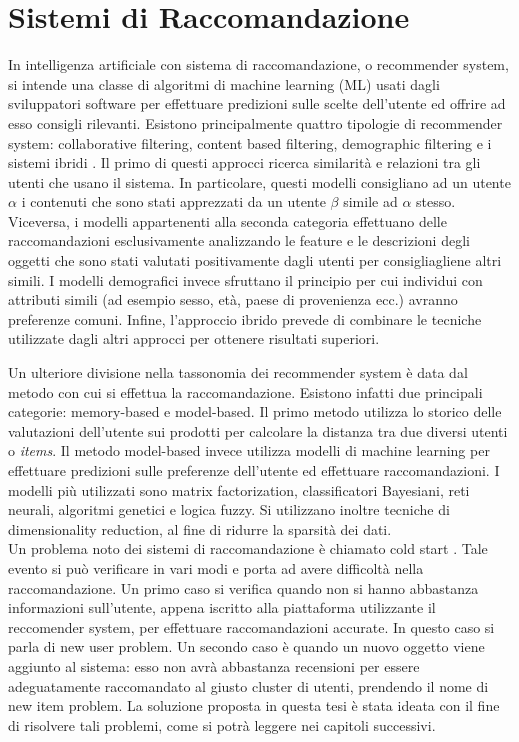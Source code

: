 \documentclass[11pt]{report}
\begin{document}
\section{Sistemi di Raccomandazione}


In intelligenza artificiale con sistema di raccomandazione, o recommender system, si intende una classe di algoritmi di machine learning (ML) usati dagli sviluppatori software per effettuare predizioni sulle scelte dell'utente ed offrire ad esso consigli rilevanti\cite{indatalabs}.  
Esistono principalmente quattro tipologie di recommender system: collaborative filtering, content based filtering, demographic filtering e i sistemi ibridi \cite{re-sys-survey}. Il primo di questi approcci ricerca similarità e relazioni tra gli utenti che usano il sistema. In particolare, questi modelli consigliano ad un utente \emph{$\alpha$} i contenuti che sono stati apprezzati da un utente \emph{$\beta$} simile ad \emph{$\alpha$} stesso. Viceversa, i modelli appartenenti alla seconda categoria effettuano delle raccomandazioni esclusivamente analizzando le feature e le descrizioni degli oggetti che sono stati valutati positivamente dagli utenti per consigliagliene altri simili. I modelli demografici invece sfruttano il principio per cui individui con attributi simili (ad esempio sesso, età, paese di provenienza ecc.) avranno preferenze comuni. Infine, l'approccio ibrido prevede di combinare le tecniche utilizzate dagli altri approcci per ottenere risultati superiori.

Un ulteriore divisione nella tassonomia dei recommender system è data dal metodo con cui si effettua la raccomandazione. Esistono infatti due principali categorie: memory-based e model-based\cite{re-sys-survey}. Il primo metodo utilizza lo storico delle valutazioni dell'utente sui prodotti per calcolare la distanza tra due diversi utenti o \textit{items}. Il metodo model-based invece utilizza modelli di machine learning per effettuare predizioni sulle preferenze dell'utente ed effettuare raccomandazioni. I modelli più utilizzati sono matrix factorization, classificatori Bayesiani, reti neurali, algoritmi genetici e logica fuzzy. Si utilizzano inoltre tecniche di dimensionality reduction, al fine di ridurre la sparsità dei dati.\\


Un problema noto dei sistemi di raccomandazione è chiamato cold start \cite{re-sys-survey}. Tale evento si può verificare in vari modi e porta ad avere difficoltà nella raccomandazione. Un primo caso si verifica quando non si hanno abbastanza informazioni sull'utente, appena iscritto alla piattaforma utilizzante il reccomender system, per effettuare raccomandazioni accurate. In questo caso si parla di new user problem. Un secondo caso è quando un nuovo oggetto viene aggiunto al sistema: esso non avrà abbastanza recensioni per essere adeguatamente raccomandato al giusto cluster di utenti, prendendo il nome di new item problem. La soluzione proposta in questa tesi è stata ideata con il fine di risolvere tali problemi, come si potrà leggere nei capitoli successivi.\\
\end{document}
